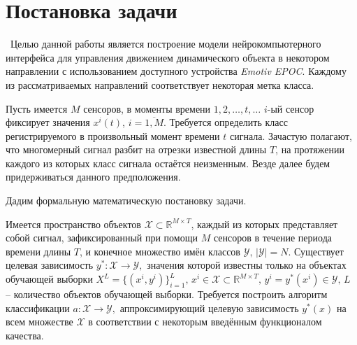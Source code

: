 \documentclass[12pt,fleqn]{article}
\begin{document}
\clearpage 

\section{Постановка задачи}
	\quad\,\,\,Целью данной работы является построение модели нейрокомпьютерного интерфейса для управления движением динамического объекта в некотором направлении с использованием доступного устройства {\it Emotiv EPOC}. Каждому из рассматриваемых направлений соответствует некоторая метка класса.
 	\par Пусть имеется $M$ сенсоров, в моменты времени $1, 2, \dots, t, \dots$ $i$-ый сенсор фиксирует значения $x^i(t)$, $i = \overline{1,M}.$ Требуется определить класс регистрируемого в произвольный момент времени $t$ сигнала. Зачастую полагают, что многомерный сигнал разбит на отрезки известной длины $T$, на протяжении каждого из которых класс сигнала остаётся неизменным. Везде далее будем придерживаться данного предположения.
	\par Дадим формальную математическую постановку задачи.
	\par Имеется пространство объектов $\mathcal{X} \subset \mathbb{R}^{M \times T}$, каждый из которых представляет собой сигнал, зафиксированный при помощи $M$ сенсоров в течение периода времени длины $T$, и конечное множество имён классов $\mathcal{Y}, \, |\mathcal{Y}| = N$. Существует целевая зависимость $y^*: \mathcal{X} \to \mathcal{Y},$ значения которой известны только на объектах обучающей выборки $X^L = \{ (x^i, y^i)\}_{i=1}^L, \, x^i \in \mathcal{X} \subset \mathbb{R}^{M \times T}, \, y^i = y^*(x^i) \in \mathcal{Y}, \, L$ -- количество объектов обучающей выборки. Требуется построить алгоритм классификации $a: \mathcal{X} \to \mathcal{Y},$ аппроксимирующий целевую зависимость $y^*(x)$ на всем множестве $\mathcal{X}$ в соответствии с некоторым введённым функционалом качества.

\clearpage 
\end{document}
